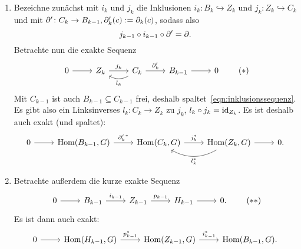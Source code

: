 \begin{vorbereitung}
  \begin{enumerate}
    \item
      Bezeichne zunächst mit $i_k$ und $j_k$ die Inklusionen $i_k \colon B_k \hookrightarrow Z_k$ und $j_k \colon Z_k \hookrightarrow C_k$ und mit $\partial'\colon C_k \to B_{k-1}, \partial'_k(c) := \partial_k(c)$, sodass also
      \begin{equation*}
        j_{k-1} \circ i_{k-1} \circ \partial' = \partial.
      \end{equation*}
      Betrachte nun die exakte Sequenz
      \begin{equation*}
        \begin{tikzcd}
          0 \arrow{r}{} & Z_k \arrow{r}{j_k}  & C_k \arrow[bend left]{l}{l_k}
                                                    \arrow{r}{\del'_k}        & B_{k-1} \arrow{r}{} & 0
        \end{tikzcd}
        \tag{$*$}\label{eqn:inklusionssequenz}
      \end{equation*}
      Mit $C_{k-1}$ ist auch $B_{k-1} \subseteq C_{k-1}$ frei, deshalb spaltet~\eqref{eqn:inklusionssequenz}.
      Es gibt also ein Linksinverses $l_k\colon C_k \to Z_k$ zu $j_k$, $l_k \circ j_k = \operatorname{id}_{Z_k}$.
      Es ist deshalb auch exakt (und spaltet):
      \begin{equation*}
        \begin{tikzcd}
          0 \arrow{r}{} & \Hom(B_{k-1},G) \arrow{r}{{\del'_k}^*}  & \Hom(C_k,G) \arrow{r}{j_k^*}  & \Hom(Z_k,G) \arrow[bend left]{l}{l_k^*}
                                                                                                              \arrow{r}{} & 0.
        \end{tikzcd}
      \end{equation*}
    \item
      Betrachte außerdem die kurze exakte Sequenz
      \begin{equation*}
        \begin{tikzcd}
          0 \arrow{r}{} & B_{k-1} \arrow{r}{i_{k-1}}  & Z_{k-1} \arrow{r}{p_{k-1}}  & H_{k-1} \arrow{r}{} & 0.
        \end{tikzcd}
        \tag{$**$}\label{eqn:inklusion_projektion_sequenz}
      \end{equation*}
      Es ist dann auch exakt:
      \begin{equation*}
        \begin{tikzcd}
          0 \arrow{r}{} & \Hom(H_{k-1},G) \arrow{r}{p_{k-1}^*}  & \Hom(Z_{k-1},G) \arrow{r}{i_{k-1}^*}  & \Hom(B_{k-1},G).
        \end{tikzcd}
      \end{equation*}
  \end{enumerate}
\end{vorbereitung}
